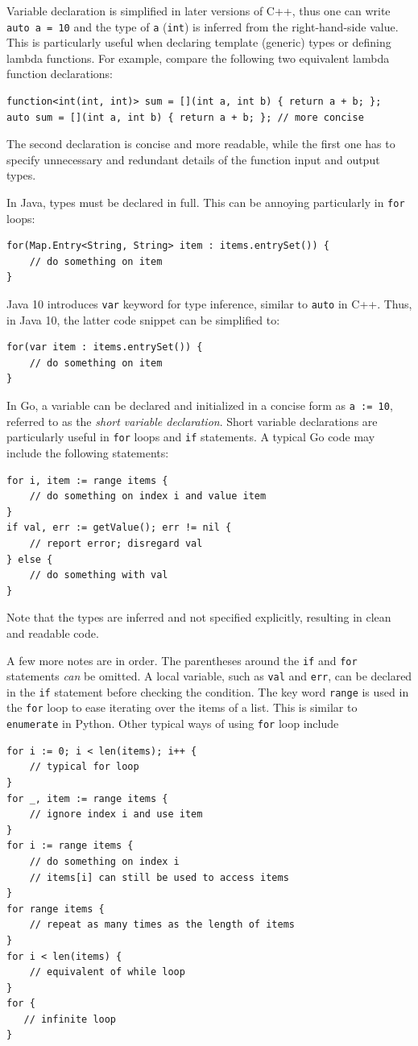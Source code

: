 \documentclass[11pt]{article}
\begin{document}
Variable declaration is simplified in later versions of C++, thus one can write \texttt{auto a = 10} and the type of \texttt{a} (\texttt{int}) is inferred from the right-hand-side value. This is particularly useful when declaring template (generic) types or defining lambda functions. For example, compare the following two equivalent lambda function declarations:
\begin{verbatim}
function<int(int, int)> sum = [](int a, int b) { return a + b; };
auto sum = [](int a, int b) { return a + b; }; // more concise
\end{verbatim}
The second declaration is concise and more readable, while the first one has to specify unnecessary and redundant details of the function input and output types.

In Java, types must be declared in full. This can be annoying particularly in \texttt{for} loops:
\begin{verbatim}
for(Map.Entry<String, String> item : items.entrySet()) {
    // do something on item
}
\end{verbatim}
Java 10 introduces \texttt{var} keyword for type inference, similar to \texttt{auto} in C++. Thus, in Java 10, the latter code snippet can be simplified to:
\begin{verbatim}
for(var item : items.entrySet()) {
    // do something on item
}
\end{verbatim}

In Go, a variable can be declared and initialized in a concise form as \texttt{a := 10}, referred to as the \emph{short variable declaration}. Short variable declarations are particularly useful in \texttt{for} loops and \texttt{if} statements. A typical Go code may include the following statements:
\begin{verbatim}
for i, item := range items {
    // do something on index i and value item
}
if val, err := getValue(); err != nil {
    // report error; disregard val
} else {
    // do something with val
}
\end{verbatim}
Note that the types are inferred and not specified explicitly, resulting in clean and readable code.

A few more notes are in order. The parentheses around the \texttt{if} and \texttt{for} statements \emph{can} be omitted. A local variable, such as \texttt{val} and \texttt{err}, can be declared in the \texttt{if} statement before checking the condition. The key word \texttt{range} is used in the \texttt{for} loop to ease iterating over the items of a list. This is similar to \texttt{enumerate} in Python. Other typical ways of using \texttt{for} loop include
\begin{verbatim}
for i := 0; i < len(items); i++ {
    // typical for loop
}
for _, item := range items {
    // ignore index i and use item
}
for i := range items {
    // do something on index i
    // items[i] can still be used to access items
}
for range items {
    // repeat as many times as the length of items
}
for i < len(items) {
    // equivalent of while loop
}
for {
   // infinite loop
}
\end{verbatim}
\end{document}
